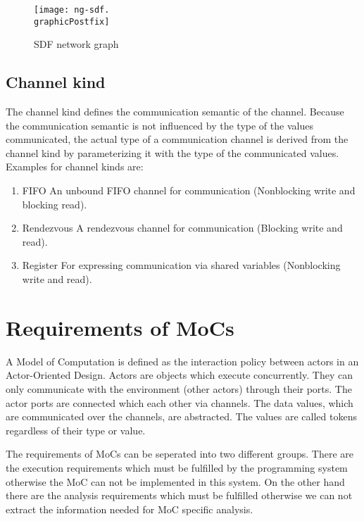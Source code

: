 \begin{figure}
\centering
\texttt{[image: ng-sdf.\\graphicPostfix]}\\
\caption{\label{ng-sdf}SDF network graph}
\end{figure}

\subsection{Channel kind}

The channel kind defines the communication semantic of the channel.
Because the communication semantic is not influenced by the
type of the values communicated, the actual type of a communication
channel is derived from the channel kind by parameterizing it with
the type of the communicated values. Examples for channel kinds are:

\begin{enumerate}
\item FIFO
  An unbound FIFO channel for communication
  (Nonblocking write and blocking read).
\item Rendezvous
  A rendezvous channel for communication %
  (Blocking write and read).
\item Register
  For expressing communication via shared variables
  (Nonblocking write and read).
\end{enumerate}

\section{Requirements of MoCs}\label{Requirements of MoCs}

A Model of Computation is defined \cite{embsft:2002} as the 
interaction policy between actors in an Actor-Oriented Design.
Actors are objects which execute concurrently. They can only
communicate with the environment (other actors) through their ports.
The actor ports are connected which each other via channels.
The data values, which are communicated over the channels,
are abstracted. The values are called tokens regardless
of their type or value.

The requirements of MoCs can be seperated into two different groups.
There are the execution requirements which must be fulfilled by
the programming system otherwise the MoC can not be implemented in
this system.
On the other hand there are the analysis requirements which
must be fulfilled otherwise we can not extract the information
needed for MoC specific analysis.

